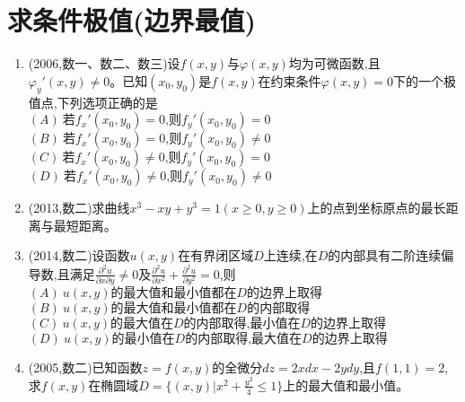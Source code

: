 \documentclass[12pt, a4paper, oneside, UTF8]{ctexbook}
\begin{document}
\section{求条件极值(边界最值)}

\begin{enumerate}[label=\arabic*.,start=11]
    \item (2006,数一、数二、数三)设$f(x,y)$与$\varphi(x,y)$均为可微函数,且$\varphi_y'(x,y)\neq 0$。已知$(x_0,y_0)$是$f(x,y)$在约束条件$\varphi(x,y)=0$下的一个极值点,下列选项正确的是 \\
    $(A)\ \text{若}f_x'(x_0,y_0)=0\text{,则}f_y'(x_0,y_0)=0$ \\
    $(B)\ \text{若}f_x'(x_0,y_0)=0\text{,则}f_y'(x_0,y_0)\neq 0$ \\
    $(C)\ \text{若}f_x'(x_0,y_0)\neq 0\text{,则}f_y'(x_0,y_0)=0$ \\
    $(D)\ \text{若}f_x'(x_0,y_0)\neq 0\text{,则}f_y'(x_0,y_0)\neq 0$
    
    \begin{solution}
    \newpage
    \end{solution}
    
    \item (2013,数二)求曲线$x^3-xy+y^3=1(x\geq 0,y\geq 0)$上的点到坐标原点的最长距离与最短距离。
    
    \begin{solution}
    \newpage
    \end{solution}
    
    \item (2014,数二)设函数$u(x,y)$在有界闭区域$D$上连续,在$D$的内部具有二阶连续偏导数,且满足$\frac{\partial^2 u}{\partial x\partial y}\neq 0$及$\frac{\partial^2 u}{\partial x^2}+\frac{\partial^2 u}{\partial y^2}=0$,则 \\
    $(A)\ u(x,y)\text{的最大值和最小值都在}D\text{的边界上取得}$ \\
    $(B)\ u(x,y)\text{的最大值和最小值都在}D\text{的内部取得}$ \\
    $(C)\ u(x,y)\text{的最大值在}D\text{的内部取得,最小值在}D\text{的边界上取得}$ \\
    $(D)\ u(x,y)\text{的最小值在}D\text{的内部取得,最大值在}D\text{的边界上取得}$

    
    \begin{solution}
    \newpage
    \end{solution}
    
    \item (2005,数二)已知函数$z=f(x,y)$的全微分$dz=2xdx-2ydy$,且$f(1,1)=2$,求$f(x,y)$在椭圆域$D=\{(x,y)|x^2+\frac{y^2}{4}\leq 1\}$上的最大值和最小值。
    
    \begin{solution}
    \newpage
    \end{solution}
\end{enumerate}

\ifx\allfiles\undefined
\end{document}
